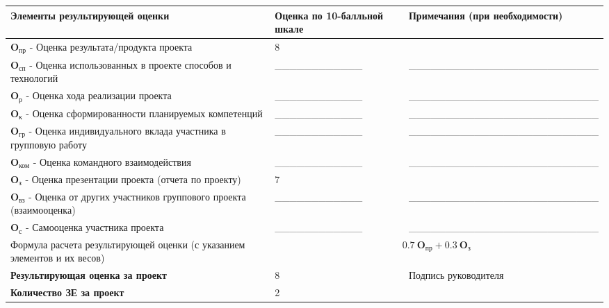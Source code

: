 \documentclass[10pt]{article}
\begin{document}
\vspace{-0.95cm}
\begin{table*}[h!]
	\centering
	\begin{tabular}{|m{}<{\centering}|m{}<{\centering}|m{}<{\centering}|}
	\noalign{\smallskip}
	\hline
	Элементы результирующей оценки\footnotemark  & Оценка по 10-балльной шкале & Примечания (при необходимости) \\
	\hline 
	{\bf $\mathbf{O_{\text{пр}}}$ } - Оценка результата/продукта проекта & 8 &  \\
	\hline 
	{\bf $\mathbf{O_{\text{сп}}}$ } - Оценка использованных в проекте способов и технологий & \_\_\_\_\_\_\_\_\_\_\_\_ & \_\_\_\_\_\_\_\_\_\_\_\_\_\_\_\_\_\_\_\_\_\_\_\_\_\_\\
	\hline 
	{\bf $\mathbf{O_{\text{р}}}$ } - Оценка хода реализации проекта & \_\_\_\_\_\_\_\_\_\_\_\_ & \_\_\_\_\_\_\_\_\_\_\_\_\_\_\_\_\_\_\_\_\_\_\_\_\_\_\\
	\hline 
	{\bf $\mathbf{O_{\text{к}}}$ } - Оценка сформированности планируемых компетенций & \_\_\_\_\_\_\_\_\_\_\_\_ & \_\_\_\_\_\_\_\_\_\_\_\_\_\_\_\_\_\_\_\_\_\_\_\_\_\_\\
	\hline 
	{\bf $\mathbf{O_{\text{гр}}}$ } - Оценка индивидуального вклада участника в групповую работу & \_\_\_\_\_\_\_\_\_\_\_\_ & \_\_\_\_\_\_\_\_\_\_\_\_\_\_\_\_\_\_\_\_\_\_\_\_\_\_\\
	\hline 
	{\bf $\mathbf{O_{\text{ком}}}$ } - Оценка командного взаимодействия & \_\_\_\_\_\_\_\_\_\_\_\_ & \_\_\_\_\_\_\_\_\_\_\_\_\_\_\_\_\_\_\_\_\_\_\_\_\_\_\\
	\hline 
	{\bf $\mathbf{O_{\text{з}}}$ } - Оценка презентации проекта (отчета по проекту) & 7 &  \\
	\hline 
	{\bf $\mathbf{O_{\text{вз}}}$ } - Оценка от других участников группового проекта (взаимооценка) & \_\_\_\_\_\_\_\_\_\_\_\_ & \_\_\_\_\_\_\_\_\_\_\_\_\_\_\_\_\_\_\_\_\_\_\_\_\_\_\\
	\hline  
	{\bf $\mathbf{O_{\text{с}}}$ } - Самооценка участника проекта & \_\_\_\_\_\_\_\_\_\_\_\_ & \_\_\_\_\_\_\_\_\_\_\_\_\_\_\_\_\_\_\_\_\_\_\_\_\_\_\\
	\hline
	
	Формула расчета результирующей оценки (с указанием элементов и их весов)  & \multicolumn{2}{c|}{$0.7~\mathbf{O_{\text{пр}}} + 0.3~\mathbf{O_{\text{з}}}$} \\
	
	\hline
	{\bf Результирующая оценка за проект} & 8 & \multirow{2}{*}{Подпись руководителя}\\
	\cline{1-2}
	{\bf Количество ЗЕ за проект} & 2 & 
	\\
	
	\hline
	
	
	\end{tabular}
\end{table*}
\end{document}
